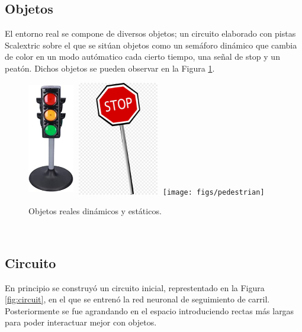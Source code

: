 \subsection{Objetos}
El entorno real se compone de diversos objetos; un circuito elaborado con pistas Scalextric sobre el que se sitúan objetos como un semáforo dinámico que cambia de color en un modo autómatico cada cierto tiempo, una señal de stop y un peatón. Dichos objetos se pueden observar en la Figura \ref{fig:objects}.\\

\begin{figure} [h!]
	\begin{center}
		\includegraphics[width=2cm, height=5cm]{figs/trafficlightreal}\hspace{0.1cm}\includegraphics[width=4cm,
			height=5cm]{figs/stopsign}\hspace{0.1cm}\texttt{[image: figs/pedestrian]}
	\end{center}
	\caption{Objetos reales dinámicos y estáticos.}
	\label{fig:objects}
\end{figure}\

\subsection{Circuito}
En principio se construyó un circuito inicial, represtentado en la Figura \ref{fig:circuit}, en el que se entrenó la red neuronal de seguimiento de carril. Posteriormente se fue agrandando en el espacio introduciendo rectas más largas para poder interactuar mejor con objetos.\\

